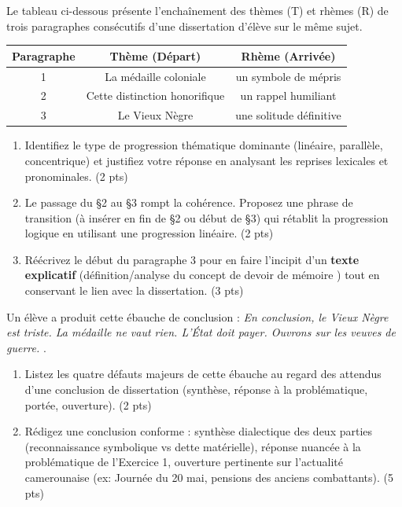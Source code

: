 \documentclass[11pt]{article}
\begin{document}
\begin{exercice}
Le tableau ci-dessous présente l'enchaînement des thèmes (T) et rhèmes (R) de trois paragraphes consécutifs d'une dissertation d'élève sur le même sujet.

\begin{center}
\begin{tabular}{|c|c|c|}
\hline
\textbf{Paragraphe} & \textbf{Thème (Départ)} & \textbf{Rhème (Arrivée)} \\
\hline
1 & La médaille coloniale & un symbole de mépris \\
\hline
2 & Cette distinction honorifique & un rappel humiliant \\
\hline
3 & Le Vieux Nègre & une solitude définitive \\
\hline
\end{tabular}
\end{center}

\begin{enumerate}
    \item Identifiez le type de progression thématique dominante (linéaire, parallèle, concentrique) et justifiez votre réponse en analysant les reprises lexicales et pronominales. (2 pts)
    \item Le passage du §2 au §3 rompt la cohérence. Proposez une phrase de transition (à insérer en fin de §2 ou début de §3) qui rétablit la progression logique en utilisant une progression linéaire. (2 pts)
    \item Réécrivez le début du paragraphe 3 pour en faire l'incipit d'un \textbf{texte explicatif} (définition/analyse du concept de \og devoir de mémoire \fg{}) tout en conservant le lien avec la dissertation. (3 pts)
\end{enumerate}
\end{exercice}

\begin{exercice}
Un élève a produit cette ébauche de conclusion : \og \textit{En conclusion, le Vieux Nègre est triste. La médaille ne vaut rien. L'État doit payer. Ouvrons sur les veuves de guerre.} \fg{}.
\begin{enumerate}
    \item Listez les quatre défauts majeurs de cette ébauche au regard des attendus d'une conclusion de dissertation (synthèse, réponse à la problématique, portée, ouverture). (2 pts)
    \item Rédigez une conclusion conforme : synthèse dialectique des deux parties (reconnaissance symbolique vs dette matérielle), réponse nuancée à la problématique de l'Exercice 1, ouverture pertinente sur l'actualité camerounaise (ex: Journée du 20 mai, pensions des anciens combattants). (5 pts)
\end{enumerate}
\end{exercice}
\end{document}
